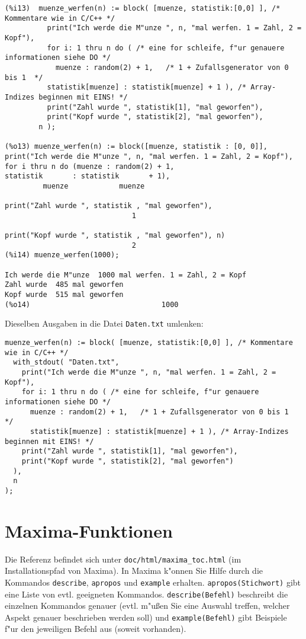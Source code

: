 \documentclass[spanish,12pt,a4paper]{article}
\begin{document}
\scriptsize
\begin{verbatim}
(%i13)  muenze_werfen(n) := block( [muenze, statistik:[0,0] ], /* Kommentare wie in C/C++ */
          print("Ich werde die M"unze ", n, "mal werfen. 1 = Zahl, 2 = Kopf"),
          for i: 1 thru n do ( /* eine for schleife, f"ur genauere informationen siehe DO */
            muenze : random(2) + 1,   /* 1 + Zufallsgenerator von 0 bis 1  */
          statistik[muenze] : statistik[muenze] + 1 ), /* Array-Indizes beginnen mit EINS! */
          print("Zahl wurde ", statistik[1], "mal geworfen"),
          print("Kopf wurde ", statistik[2], "mal geworfen"),
        n );

(%o13) muenze_werfen(n) := block([muenze, statistik : [0, 0]], 
print("Ich werde die M"unze ", n, "mal werfen. 1 = Zahl, 2 = Kopf"), 
for i thru n do (muenze : random(2) + 1, 
statistik       : statistik       + 1), 
         muenze            muenze

print("Zahl wurde ", statistik , "mal geworfen"), 
                              1

print("Kopf wurde ", statistik , "mal geworfen"), n)
                              2
(%i14) muenze_werfen(1000);

Ich werde die M"unze  1000 mal werfen. 1 = Zahl, 2 = Kopf 
Zahl wurde  485 mal geworfen 
Kopf wurde  515 mal geworfen 
(%o14)                               1000
\end{verbatim}
\normalsize

Dieselben Ausgaben in die Datei \verb|Daten.txt| umlenken:

\scriptsize
\begin{verbatim}
muenze_werfen(n) := block( [muenze, statistik:[0,0] ], /* Kommentare wie in C/C++ */
  with_stdout( "Daten.txt", 
    print("Ich werde die M"unze ", n, "mal werfen. 1 = Zahl, 2 = Kopf"),
    for i: 1 thru n do ( /* eine for schleife, f"ur genauere informationen siehe DO */
      muenze : random(2) + 1,   /* 1 + Zufallsgenerator von 0 bis 1  */
      statistik[muenze] : statistik[muenze] + 1 ), /* Array-Indizes beginnen mit EINS! */
    print("Zahl wurde ", statistik[1], "mal geworfen"),
    print("Kopf wurde ", statistik[2], "mal geworfen")
  ),
  n 
);
\end{verbatim}
\normalsize


\section{Maxima-Funktionen}

Die Referenz befindet sich unter \verb|doc/html/maxima_toc.html| (im Installationspfad von Maxima). In Maxima k"onnen Sie Hilfe durch die Kommandos \verb|describe|, \verb|apropos| und \verb|example| erhalten. \verb|apropos(Stichwort)| gibt eine Liste von evtl. geeigneten Kommandos. \verb|describe(Befehl)| beschreibt die einzelnen Kommandos genauer (evtl. m"u{\ss}en Sie eine Auswahl treffen, welcher Aspekt genauer beschrieben werden soll) und \verb|example(Befehl)| gibt Beispiele f"ur den jeweiligen Befehl aus (soweit vorhanden).
\end{document}
